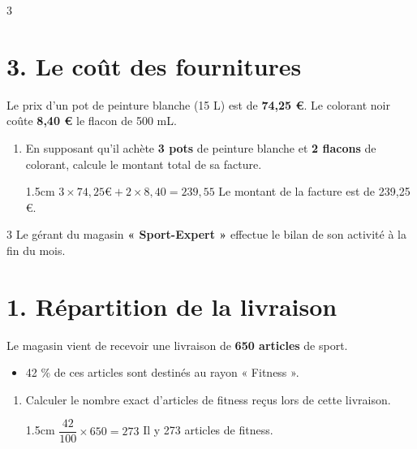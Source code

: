 \documentclass[a4paper]{book}
\begin{document}
{\begin{exerciceNote}{3}
\newpage
        
        \section*{3. Le coût des fournitures}
        Le prix d'un pot de peinture blanche (15 L) est de \textbf{74,25 \euro}. Le colorant noir coûte \textbf{8,40 \euro} le flacon de 500 mL.
        
        \begin{enumerate}[resume, leftmargin=*]
            \item En supposant qu'il achète \textbf{3 pots} de peinture blanche et \textbf{2 flacons} de colorant, calcule le montant total de sa facture.
               
            \begin{ZoneReponse}{1.5cm}
                $3\times74,25€+2\times8,40=239,55$  \quad Le montant de la facture est de 239,25 €.
            \end{ZoneReponse} 
        \end{enumerate}
    \end{exerciceNote} 


    \begin{exerciceNote}{3}
        \noindent Le gérant du magasin \textbf{« Sport-Expert »} effectue le bilan de son activité à la fin du mois.
    
        \section*{1. Répartition de la livraison}
        Le magasin vient de recevoir une livraison de \textbf{650 articles} de sport.
        \begin{itemize}[label=\textbullet, leftmargin=*]
            \item 42 \% de ces articles sont destinés au rayon « Fitness ».
        \end{itemize}
        
        \begin{enumerate}[leftmargin=*]
            \item Calculer le nombre exact d'articles de fitness reçus lors de cette livraison.

            \begin{ZoneReponse}{1.5cm}   
                $\dfrac{42}{100}\times650=273$
                \quad Il y 273 articles de fitness.
            \end{ZoneReponse}
        \end{enumerate}
        

\end{exerciceNote}}
\end{document}

